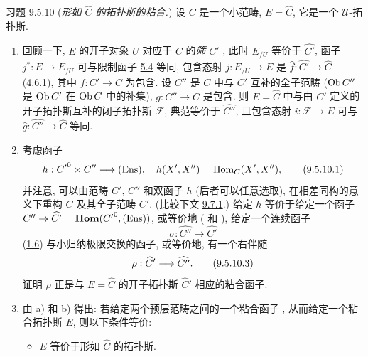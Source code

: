 \begin{enonce*}[remark]{习题 9.5.10}
(\emph{形如 $\widehat{C}$ 的拓扑斯的粘合.})
设 $C$ 是一个小范畴, $E=\widehat{C}$, 它是一个 $𝒰$-拓扑斯.
\begin{enumerate}
\renewcommand{\theenumi}{\alph{enumi}}
\renewcommand{\labelenumi}{\theenumi)}
\item 回顾一下, $E$ 的开子对象 $U$ 对应于 $C$ 的\emph{筛} $C'$
,
此时 $E_{/U}$ 等价于 $\widehat{C'}$,
函子 $j^{\ast}:E\rightarrow E_{/U}$ 可与限制函子
\hyperref[IV.subsec5.4]{5.4} 等同,
\ie 包含态射 $j:E_{/U}\rightarrow E$ 是
$\widehat{f}:\widehat{C'}\rightarrow\widehat{C}$
(\hyperref[IV.subsubsec4.6.1]{4.6.1}),
其中 $f:C'\rightarrow C$ 为包含.
设 $C''$ 是 $C$ 中与 $C'$ 互补的全子范畴
(\ie $\operatorname{Ob} C''$ 是 $\operatorname{Ob} C'$ 在 $\operatorname{Ob} C$ 中的补集),
$g:C''\rightarrow C$ 是包含.
则 $E=\widehat{C}$ 中与由 $C'$ 定义的开子拓扑斯互补的闭子拓扑斯 $\mathcal{F}$,
典范等价于 $\widehat{C''}$,
且包含态射 $i:\mathcal{F}\rightarrow E$
可与 $\widehat{g}:\widehat{C''}\rightarrow\widehat{C}$ 等同.

\item 考虑\pageoriginale 函子
\begin{equation*}
h:{C'}^0\times C''\longrightarrow (\operatorname{Ens}),\quad
h(X',X'')=\operatorname{Hom}_C(X',X''){},\tag{9.5.10.1}
\end{equation*}
并注意, 可以由范畴 $C'$, $C''$ 和双函子 $h$
(后者可以任意选取),
在相差同构的意义下重构 $C$ 及其全子范畴 $C'$.
(比较下文 \hyperref[IV.subsec9.7.1]{9.7.1}.)
给定 $h$ 等价于给定一个函子
$C''\rightarrow\widehat{C'}=\operatorname{\mathbf{Hom}}({C'}^0,(\operatorname{Ens}))$,
或等价地 ( 和 ),
给定一个连续函子
\begin{equation*}
\sigma:\widehat{C''}\longrightarrow \widehat{C'}\tag{9.5.10.2}
\end{equation*}
\ie (\hyperref[IV.cor1.6]{1.6}) 与小归纳极限交换的函子,
或等价地, 有一个右伴随
\begin{equation*}
\rho:\widehat{C}'\longrightarrow \widehat{C''}{}.\tag{9.5.10.3}
\end{equation*}
证明 $\rho$ 正是与 $E=\widehat{C}$ 的开子拓扑斯 $\widehat{C}'$ 相应的粘合函子.

\item 由 a) 和 b) 得出:
若给定两个预层范畴之间的一个粘合函子
, 从而给定一个粘合拓扑斯 $E$,
则以下条件等价:
\begin{itemize}
\item[(i)] $E$ 等价于形如 $\widehat{C}$ 的拓扑斯.


\end{itemize}
\end{enumerate}
\end{enonce*}
